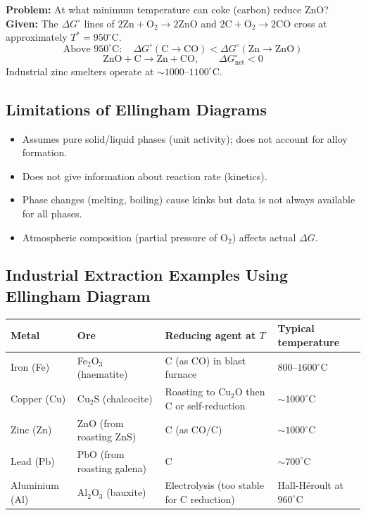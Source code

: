 \documentclass[12pt,a4paper]{article}
\begin{document}
\begin{tcolorbox}[examplebox, title={Solved Example: Reading the Ellingham Diagram}]
\textbf{Problem:} At what minimum temperature can coke (carbon) reduce ZnO?\\
\textbf{Given:} The $\Delta G^\circ$ lines of $\mathrm{2Zn + O_2 \to 2ZnO}$ and $\mathrm{2C + O_2 \to 2CO}$ cross at approximately $T^* = 950^\circ\mathrm{C}$.
\[
\text{Above } 950^\circ\mathrm{C}: \quad \Delta G^\circ(\mathrm{C\to CO}) < \Delta G^\circ(\mathrm{Zn\to ZnO})
\]
\[
\mathrm{ZnO + C \to Zn + CO}, \qquad \Delta G^\circ_{\mathrm{net}} < 0
\]
Industrial zinc smelters operate at $\sim 1000$--$1100^\circ\mathrm{C}$.
\end{tcolorbox}

\subsection{Limitations of Ellingham Diagrams}
\begin{itemize}[leftmargin=*, itemsep=2pt, topsep=2pt]
  \item Assumes pure solid/liquid phases (unit activity); does not account for alloy formation.
  \item Does not give information about reaction rate (kinetics).
  \item Phase changes (melting, boiling) cause kinks but data is not always available for all phases.
  \item Atmospheric composition (partial pressure of O$_2$) affects actual $\Delta G$.
\end{itemize}

\subsection{Industrial Extraction Examples Using Ellingham Diagram}
\begin{tabularx}{\linewidth}{|B{2.4cm}|Y|Y|Y|}
\hline
\textbf{Metal} & \textbf{Ore} & \textbf{Reducing agent at $T$} & \textbf{Typical temperature} \\
\hline
Iron (Fe) & Fe$_2$O$_3$ (haematite) & C (as CO) in blast furnace & $800$--$1600^\circ$C \\
\hline
Copper (Cu) & Cu$_2$S (chalcocite) & Roasting to Cu$_2$O then C or self-reduction & $\sim 1000^\circ$C \\
\hline
Zinc (Zn) & ZnO (from roasting ZnS) & C (as CO/C) & $\sim 1000^\circ$C \\
\hline
Lead (Pb) & PbO (from roasting galena) & C & $\sim 700^\circ$C \\
\hline
Aluminium (Al) & Al$_2$O$_3$ (bauxite) & Electrolysis (too stable for C reduction) & Hall-H\'{e}roult at $960^\circ$C \\
\hline
\end{tabularx}
\end{document}
